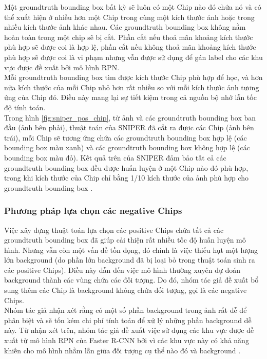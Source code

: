 {    \noindent
    Một groundtruth  bounding box  bất kỳ sẽ luôn có một Chip nào đó chứa nó và có thể xuất hiện ở nhiều hơn một Chip trong cùng một kích thước ảnh hoặc trong nhiều kích thước ảnh khác nhau.
    Các groundtruth  bounding box  không nằm hoàn toàn trong một chip sẽ bị cắt.
    Phần cắt nếu thoả mãn khoảng kích thước phù hợp sẽ được coi là hợp lệ, phần cắt nếu không thoả mãn khoảng kích thước phù hợp sẽ được coi là vi phạm nhưng vẫn được sử dụng để gán label cho các khu vực được đề xuất bởi mô hình RPN. \\
    Mỗi groundtruth  bounding box  tìm được kích thước Chip phù hợp để học, và hơn nữa kích thước của mỗi Chip nhỏ hơn rất nhiều so với mỗi kích thước ảnh tương ứng của Chip đó.
    Điều này mang lại sự tiết kiệm trong cả nguồn bộ nhớ lẫn tốc độ tính toán. \\
    Trong hình \ref{fig:sniper_pos_chip}, từ ảnh và các groundtruth  bounding box  ban đầu (ảnh bên phải), thuật toán của SNIPER  đã cắt ra được các Chip (ảnh bên trái), mỗi Chip sẽ tương ứng chứa các groundtruth  bounding box  hợp lệ (các bounding box  màu xanh) và các groundtruth  bounding box  không hợp lệ (các bounding box  màu đỏ).
    Kết quả trên của SNIPER  đảm bảo tất cả các groundtruth  bounding box  đều được huấn luyện ở một Chip nào đó phù hợp, trong khi kích thước của Chip chỉ bằng 1/10 kích thước của ảnh phù hợp cho groundtruth  bounding box .

    \subsubsection{Phương pháp lựa chọn các negative Chips}
    Việc xây dựng thuật toán lựa chọn các positive Chips chứa tất cả các groundtruth  bounding box  đã giúp cải thiện rất nhiều tốc độ huấn luyện mô hình.
    Nhưng vẫn còn một vấn đề tồn đọng, đó chính là việc thiếu hụt một lượng lớn background  (do phần lớn background  đã bị loại bỏ trong thuật toán sinh ra các positive Chips).
    Điều này dẫn đến việc mô hình thường xuyên dự đoán background  thành các vùng chứa các đối tượng.
    Do đó, nhóm tác giả đề xuất bổ sung thêm các Chip là background  không chứa đối tượng, gọi là các negative Chips. \\
    Nhóm tác giả nhận xét rằng có một số phần background  trong ảnh rất dễ để phân biệt và sẽ tốn kém chi phí tính toán để xử lý những phần background  dễ này.
    Từ nhận xét trên, nhóm tác giả đề xuất việc sử dụng các khu vực được đề xuất từ mô hình RPN của Faster R-CNN bởi vì các khu vực này có khả năng khiến cho mô hình nhầm lẫn giữa đối tượng cụ thể nào đó và background .

}
